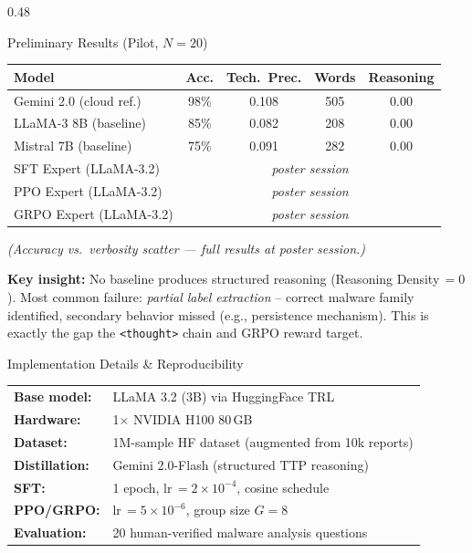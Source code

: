 \documentclass[final]{beamer}
\newcommand{\vsep}{\vspace{1.2em}}
\begin{document}
\begin{frame}[t]{}
\begin{columns}[T]
\begin{column}{0.48\linewidth}
\begin{block}{Preliminary Results \textnormal{(Pilot, $N\!=\!20$)}}
\begin{center}
\begin{tabular}{lcccc}
  \toprule
  \textbf{Model} & \textbf{Acc.} & \textbf{Tech.\ Prec.}
                 & \textbf{Words} & \textbf{Reasoning} \\
  \midrule
  Gemini 2.0 (cloud ref.)   & 98\% & 0.108 & 505 & 0.00 \\
  LLaMA-3 8B (baseline)     & 85\% & 0.082 & 208 & 0.00 \\
  Mistral 7B (baseline)     & 75\% & 0.091 & 282 & 0.00 \\
  \midrule
  SFT Expert (LLaMA-3.2)   & \multicolumn{4}{c}{\emph{poster session}} \\
  PPO Expert (LLaMA-3.2)   & \multicolumn{4}{c}{\emph{poster session}} \\
  GRPO Expert (LLaMA-3.2)  & \multicolumn{4}{c}{\emph{poster session}} \\
  \bottomrule
\end{tabular}
\end{center}

\vsep

\textit{(Accuracy vs.\ verbosity scatter --- full results at poster session.)}

\vsep
\textbf{Key insight:} No baseline produces structured reasoning
(Reasoning Density\,$=\!0$).
Most common failure: \emph{partial label extraction} -- correct malware
family identified, secondary behavior missed (e.g., persistence mechanism).
This is exactly the gap the \texttt{<thought>} chain and GRPO reward target.

\end{block}

\vsep

\begin{block}{Implementation Details \& Reproducibility}

\begin{tabular}{ll}
  \textbf{Base model:}   & LLaMA 3.2 (3B) via HuggingFace TRL \\
  \textbf{Hardware:}     & 1$\times$ NVIDIA H100 80\,GB \\
  \textbf{Dataset:}      & 1M-sample HF dataset (augmented from 10k reports) \\
  \textbf{Distillation:} & Gemini 2.0-Flash (structured TTP reasoning) \\
  \textbf{SFT:}          & 1 epoch, lr\,$=2{\times}10^{-4}$, cosine schedule \\
  \textbf{PPO/GRPO:}     & lr\,$=5{\times}10^{-6}$, group size $G{=}8$ \\
  \textbf{Evaluation:}   & 20 human-verified malware analysis questions \\
\end{tabular}


\end{block}
\end{column}
\end{columns}
\end{frame}
\end{document}
